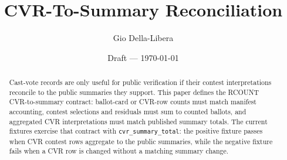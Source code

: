 \documentclass[12pt]{article}
\title{CVR-To-Summary Reconciliation}
\author{Gio Della-Libera}
\date{Draft --- \today}
\begin{document}
\maketitle

\begin{abstract}
Cast-vote records are only useful for public verification if their contest
interpretations reconcile to the public summaries they support. This paper
defines the RCOUNT CVR-to-summary contract: ballot-card or CVR-row counts must
match manifest accounting, contest selections and residuals must sum to counted
ballots, and aggregated CVR interpretations must match published summary
totals. The current fixtures exercise that contract with
\texttt{cvr\_summary\_total}: the positive fixture passes when CVR contest rows
aggregate to the public summaries, while the negative fixture fails when a CVR
row is changed without a matching summary change.
\end{abstract}









\nocite{rcount-overview-2026,rcount-substrate-2026,rcount-v5-2026}


\end{document}
